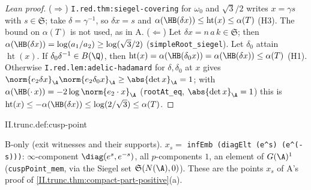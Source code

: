 \begin{proof}[Lean proof]
($\Rightarrow$) \texttt{I.red.thm:siegel-covering} for $\omega_0$ and $\sqrt3/2$ writes $x=\gamma s$ with $s\in\mathfrak S$; take $\delta=\gamma^{-1}$, so $\delta x=s$ and $\alpha(\HB(\delta x))\le\operatorname{ht}(x)\le\alpha(T)$ (H3). The bound on $\alpha(T)$ is not used, as in A. ($\Leftarrow$) Let $\delta x=n\,a\,k\in\mathfrak S$; then $\alpha(\HB(\delta x))=\log(a_1/a_2)\ge\log(\sqrt3/2)$ (\texttt{simpleRoot\_siegel}). Let $\delta_0$ attain $\operatorname{ht}(x)$. If $\delta_0\delta^{-1}\in B(\Q)$, then $\operatorname{ht}(x)=\alpha(\HB(\delta_0x))=\alpha(\HB(\delta x))\le\alpha(T)$ (H1). Otherwise \texttt{I.red.lem:adelic-hadamard} for $\delta,\delta_0$ at $x$ gives $\norm{e_2\delta x}_\A\norm{e_2\delta_0x}_\A\ge\abs{\det x}_\A=1$; with $\alpha(\HB(\cdot\,x))=-2\log\norm{e_2\cdot x}_\A$ (\texttt{rootAt\_eq}, $\abs{\det x}_\A=1$) this is $\operatorname{ht}(x)\le-\alpha(\HB(\delta x))\le\log(2/\sqrt3)\le\alpha(T)$.
\end{proof}

\begin{definition}
\bonly
{}
\end{definition}
\begin{tfformal}{II.trunc.def:cusp-point}
\begin{tffidelity}
B-only (exit witnesses and their supports). $x_s=$ \texttt{infEmb (diagElt (e\^{}s) (e\^{}(-s)))}: $\infty$-component $\diag(e^s,e^{-s})$, all $p$-components $1$, an element of $G(\A)^1$ (\texttt{cuspPoint\_mem}, via the Siegel set $\mathfrak S(N(\A),0)$). These are the points $x_s$ of A's proof of \cref{II.trunc.thm:compact-part-positive}(a).
\end{tffidelity}
\end{tfformal}


